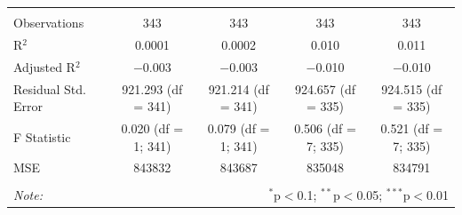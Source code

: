 \documentclass[12pt]{article}
\begin{document}
\begin{table}[!htbp]
\begin{adjustbox}{width=\textwidth}
\begin{tabular}{@{\extracolsep{5pt}}lcccc}
  & & & & \\ 
\hline \\[-1.8ex] 
Observations & 343 & 343 & 343 & 343 \\ 
R$^{2}$ & 0.0001 & 0.0002 & 0.010 & 0.011 \\ 
Adjusted R$^{2}$ & $-$0.003 & $-$0.003 & $-$0.010 & $-$0.010 \\ 
Residual Std. Error & 921.293 (df = 341) & 921.214 (df = 341) & 924.657 (df = 335) & 924.515 (df = 335) \\ 
F Statistic & 0.020 (df = 1; 341) & 0.079 (df = 1; 341) & 0.506 (df = 7; 335) & 0.521 (df = 7; 335) \\ 
MSE & 843832 & 843687 & 835048 & 834791 \\
\hline 
\hline \\[-1.8ex] 
\textit{Note:}  & \multicolumn{4}{r}{$^{*}$p$<$0.1; $^{**}$p$<$0.05; $^{***}$p$<$0.01} \\ 
\end{tabular} 
\end{adjustbox}
\end{table} 
\end{document}
